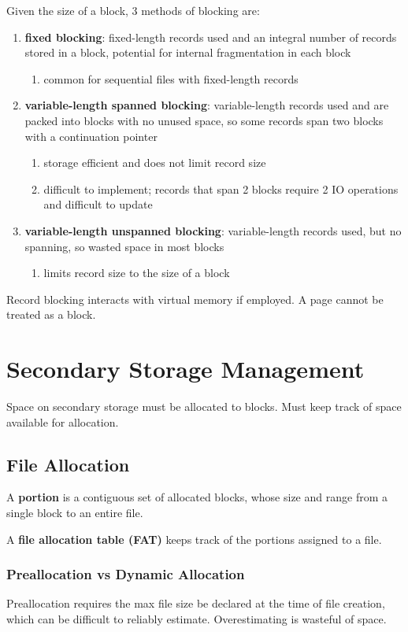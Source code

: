\documentclass[11pt]{article}
\begin{document}
Given the size of a block, 3 methods of blocking are:
\begin{enumerate}
\item \textbf{fixed blocking}: fixed-length records used and an integral number of records stored in a block,
potential for internal fragmentation in each block
\begin{enumerate}
\item common for sequential files with fixed-length records
\end{enumerate}
\item \textbf{variable-length spanned blocking}: variable-length records used and are packed into blocks with
no unused space, so some records span two blocks with a continuation pointer
\begin{enumerate}
\item storage efficient and does not limit record size
\item difficult to implement; records that span 2 blocks require 2 IO operations and difficult to update
\end{enumerate}
\item \textbf{variable-length unspanned blocking}: variable-length records used, but no spanning, so wasted
space in most blocks
\begin{enumerate}
\item limits record size to the size of a block
\end{enumerate}
\end{enumerate}

Record blocking interacts with virtual memory if employed.
A page cannot be treated as a block.
\section{Secondary Storage Management}
\label{sec:org65924f2}
Space on secondary storage must be allocated to blocks.
Must keep track of space available for allocation.
\subsection{File Allocation}
\label{sec:org3e9ea21}
A \textbf{portion} is a contiguous set of allocated blocks, whose size and range from a single block to
an entire file.

A \textbf{file allocation table (FAT)} keeps track of the portions assigned to a file.
\subsubsection{Preallocation vs Dynamic Allocation}
\label{sec:org4a395fe}
Preallocation requires the max file size be declared at the time of file creation, which can be
difficult to reliably estimate.
Overestimating is wasteful of space.
\end{document}

